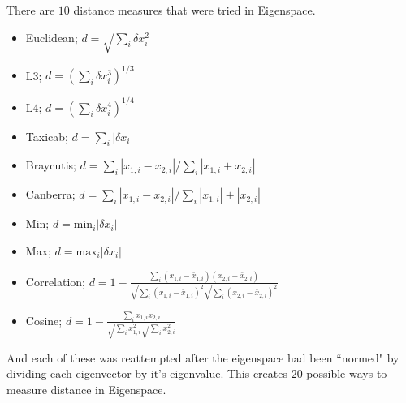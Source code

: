 There are \(10\) distance measures that were tried in Eigenspace.
\begin{itemize}
    \item Euclidean; \(d = \sqrt{\sum_i \delta x_i^2}\)
    \item L3; \(d = {(\sum_i \delta x_i^3)}^{1/3}\)
    \item L4; \(d = {(\sum_i \delta x_i^4)}^{1/4}\)
    \item Taxicab; \(d = \sum_i |\delta x_i|\)
    \item Braycutis; \(d = \sum_i |x_{1,i} - x_{2,i}|/\sum_i |x_{1,i} + x_{2,i}|\)
    \item Canberra; \(d = \sum_i |x_{1,i} - x_{2,i}|/\sum_i |x_{1,i}| + |x_{2,i}|\)
    \item Min; \(d = \text{min}_i |\delta x_i|\)
    \item Max; \(d = \text{max}_i |\delta x_i|\)
\item Correlation; \(d = 1 - \frac{\sum_i (x_{1,i} - \bar{x}_{1,i})(x_{2,i} - \bar{x}_{2,i})}
                                  {\sqrt{\sum_i (x_{1,i} - \bar{x}_{1,i})^2}\sqrt{\sum_i (x_{2,i} - \bar{x}_{2,i})^2}}\)
\item Cosine; \(d = 1 - \frac{\sum_i x_{1,i}x_{2,i}}
                                  {\sqrt{\sum_i x_{1,i}^2}\sqrt{\sum_i x_{2,i}^2}}\)
\end{itemize}
And each of these was reattempted after the eigenspace had been ``normed" by 
dividing each eigenvector by it's eigenvalue.
This creates \(20\) possible ways to measure distance in Eigenspace.


